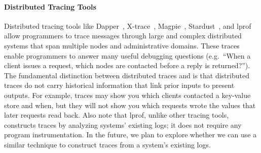 \paragraph{Distributed Tracing Tools}
Distributed tracing tools like Dapper~\cite{sigelman2010dapper},
X-trace~\cite{fonseca2007x}, Magpie~\cite{barham2003magpie},
Stardust~\cite{thereska2006stardust}, and lprof~\cite{zhao2014lprof} allow
programmers to trace messages through large and complex distributed systems
that span multiple nodes and administrative domains. These traces enable
programmers to answer many useful debugging questions (e.g.\ ``When a client
issues a request, which nodes are contacted before a reply is returned?''). The
fundamental distinction between distributed traces and \watprovenance{} is that
distributed traces do not carry historical information that link prior inputs
to present outputs. For example, traces may show you which clients contacted a
key-value store and when, but they will not show you which requests wrote the
values that later requests read back.
%
Also note that lprof, unlike other tracing tools, constructs traces by
analyzing systems' existing logs; it does not require any program
instrumentation. In the future, we plan to explore whether we can use a similar
technique to construct traces from a system's existing logs.
